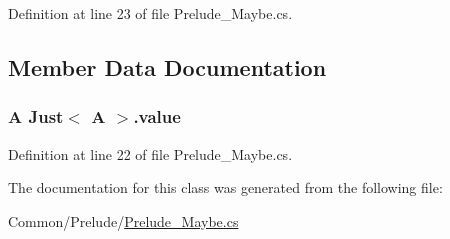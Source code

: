 Definition at line 23 of file Prelude\+\_\+\+Maybe.\+cs.



\subsection{Member Data Documentation}
\hypertarget{class_just_3_01_a_01_4_ac0fb7ee0ebfa8c2260f7e2c13ac863b9}{
\subsubsection[{value}]{\setlength{\rightskip}{0pt plus 5cm}A {\bf Just}$<$ A $>$.value}}\label{class_just_3_01_a_01_4_ac0fb7ee0ebfa8c2260f7e2c13ac863b9}


Definition at line 22 of file Prelude\+\_\+\+Maybe.\+cs.



The documentation for this class was generated from the following file\+:\begin{DoxyCompactItemize}
\item 
Common/\+Prelude/\hyperlink{_prelude___maybe_8cs}{Prelude\+\_\+\+Maybe.\+cs}\end{DoxyCompactItemize}

